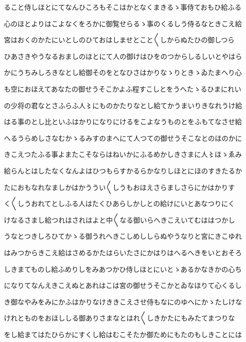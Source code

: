 \documentclass[a4paper,11pt,landscape]{ltjtarticle}
\begin{document}
\par\medskip
ること侍しほとにてなんひころもそこはかとなくまきるゝ事侍ておもひ給ふる
\par\medskip
心のほとよりはこよなくをろかに御覧せらるゝ事のくるしう侍るなときこえ給
\par\medskip
宮はおくのかたにいとしのひておはしませとこと〱しからぬたひの御しつら
\par\medskip
ひあさきやうなるおましのほとにて人の御けはひをのつからしるしいとやはら
\par\medskip
かにうちみしろきなとし給御そのをとなひさはかりなゝりときゝゐたまへり心
\par\medskip
も空におほえてあなたの御せうそこかよふ程すこしとをうへたゝるひまにれい
\par\medskip
の少将の君なとさふらふ人〻にものかたりなとし給てかうまいりきなれうけ給
\par\medskip
はる事のとし比といふはかりになりにけるをこよなうものとをふもてなさせ給
\par\medskip
へるうらめしさなむかゝるみすのまへにて人つての御せうそこなとのほのかに
\par\medskip
きこえつたふる事よまたこそならはねいかにふるめかしきさまに人〻ほゝゑみ
\par\medskip
給らんとはしたなくなんよはひつもらすかるらかなりしほとにほのすきたるか
\par\medskip
たにおもなれなましかはかううい〱しうもおほえさらましさらにかはかりす
\par\medskip
く〱しうおれてとしふる人はたくひあらしかしとの給けにいとあなつりにく
\par\medskip
けなるさまし給つれはされはよと中〱なる御いらへきこえいてむははつかし
\par\medskip
うなとつきしろひてかゝる御うれへきこしめししらぬやうなりと宮にきこゆれ
\par\medskip
はみつからきこえ給はさめるかたはらいたさにかはりはへるへきをいとおそろ
\par\medskip
しきまてものし給ふめりしをみあつかひ侍しほとにいとゝあるかなきかの心ち
\par\medskip
になりてなんえきこえぬとあれはこは宮の御せうそこかとゐなほりて心くるし
\par\medskip
き御なやみをみにかふはかりなけききこえさせ侍もなにのゆへにかゝたしけな
\par\medskip
けれとものをおほししる御ありさまなとはれ〱しきかたにもみたてまつりな
\par\medskip
をし給まてはたひらかにすくし給はむこそたか御ためにもたのもしきことには
\par\medskip
\end{document}
